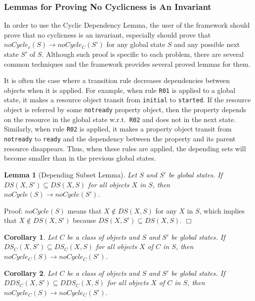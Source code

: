 \documentclass[12pt]{report}
\newtheorem{lemma}{Lemma}
\newtheorem{corollary}{Corollary}
\newcommand{\ra}{\rightarrow}
\begin{document}
\subsubsection{Lemmas for Proving No Cyclicness is An Invariant}
In order to use the Cyclic Dependency Lemma, the user of the framework
should prove that no cyclicness is an invariant, especially should
prove that $noCycle_c(S) \ra noCycle_C(S')$ for any global state $S$
and any possible next state $S'$ of $S$. Although such proof is
specific to each problem, there are several common techniques and the
framework provides several proved lemmas for them.

It is often the case where a transition rule decreases dependencies
between objects when it is applied. For example, when rule {\tt R01}
is applied to a global state, it makes a resource object transit from
{\tt initial} to {\tt started}. If the resource object is referred by
some {\tt notready} property object, then the property depends on the
resource in the global state w.r.t.\ {\tt R02} and does not in the
next state. Similarly, when rule {\tt R02} is applied, it makes a
property object transit from {\tt notready} to {\tt ready} and the
dependency between the property and its parent resource disappears.
Thus, when these rules are applied, the depending sets will become
smaller than in the previous global states.

\begin{lemma}[Depending Subset Lemma]
Let $S$ and $S'$ be global states.  If $DS(X,S')\subseteq DS(X,S)$ for all
objects $X$ in $S$, then $noCycle(S) \ra noCycle(S')$.
\end{lemma}
Proof: $noCycle(S)$ means that $X\not\in DS(X,S)$ for any $X$ in $S$,
which implies that $X\not\in DS(X,S')$ because $DS(X,S')\subseteq
DS(X,S)$.  $\Box$

\begin{corollary}
Let $C$ be a class of objects and $S$ and $S'$ be global states.  If
$DS_C(X,S')\subseteq DS_C(X,S)$ for all objects $X$ of $C$ in $S$,
then $noCycle_C(S) \ra noCycle_C(S')$.
\end{corollary}

\begin{corollary}
Let $C$ be a class of objects and $S$ and $S'$ be global states.  If
$DDS_C(X,S')\subseteq DDS_C(X,S)$ for all objects $X$ of $C$ in $S$,
then $noCycle_C(S) \ra noCycle_C(S')$.
\end{corollary}
\end{document}
